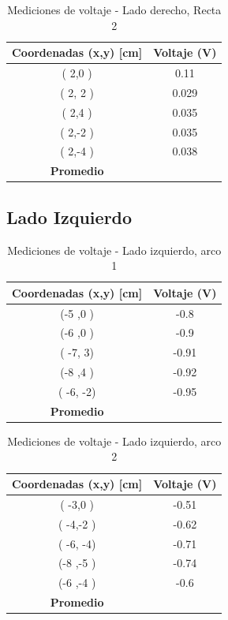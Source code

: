 \documentclass[11pt,twocolumn]{article}
\begin{document}
\begin{table}[h]
\centering
\caption{Mediciones de voltaje - Lado derecho, Recta 2}
\begin{tabular}{cc}
\toprule
\textbf{Coordenadas (x,y) [cm]} & \textbf{Voltaje (V)} \\
\midrule
( 2,0 ) & 0.11 \\
( 2, 2 ) & 0.029 \\
( 2,4 ) & 0.035 \\
( 2,-2 ) & 0.035 \\
( 2,-4 ) & 0.038 \\
\midrule
\textbf{Promedio} &  \\
\bottomrule
\end{tabular}
\end{table}

\subsection*{Lado Izquierdo}

\begin{table}[h]
\centering
\caption{Mediciones de voltaje - Lado izquierdo, arco 1}
\begin{tabular}{cc}
\toprule
\textbf{Coordenadas (x,y) [cm]} & \textbf{Voltaje (V)} \\
\midrule
(-5 ,0 ) &  -0.8\\
(-6 ,0 ) &  -0.9\\
( -7, 3) &  -0.91\\
(-8 ,4 ) &  -0.92\\
( -6, -2) &  -0.95\\
\midrule
\textbf{Promedio} &  \\
\bottomrule
\end{tabular}
\end{table}

\begin{table}[h]
\centering
\caption{Mediciones de voltaje - Lado izquierdo, arco 2}
\begin{tabular}{cc}
\toprule
\textbf{Coordenadas (x,y) [cm]} & \textbf{Voltaje (V)} \\
\midrule
( -3,0 ) &  -0.51 \\
( -4,-2 ) &  -0.62\\
( -6, -4) &  -0.71\\
(-8 ,-5 ) &  -0.74\\
(-6 ,-4 ) & -0.6 \\
\midrule
\textbf{Promedio} &  \\
\bottomrule
\end{tabular}
\end{table}
\end{document}
